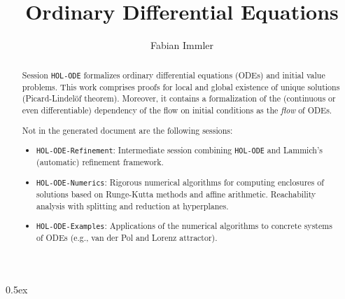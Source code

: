 \documentclass[11pt,a4paper]{article}
\title{Ordinary Differential Equations}
\author{Fabian Immler}
\begin{document}
\maketitle

\begin{abstract}

Session \texttt{HOL-ODE} formalizes ordinary differential equations (ODEs) and initial value
problems. This work comprises proofs for local and global existence of unique solutions
(Picard-Lindelöf theorem). Moreover, it contains a formalization of the (continuous or even
differentiable) dependency of the flow on initial conditions as the \emph{flow} of ODEs.

Not in the generated document are the following sessions:
\begin{itemize}
\item \texttt{HOL-ODE-Refinement}:
  Intermediate session combining \texttt{HOL-ODE} and Lammich's (automatic) refinement framework.
\item \texttt{HOL-ODE-Numerics}:
  Rigorous numerical algorithms for computing enclosures of solutions based on Runge-Kutta methods
  and affine arithmetic. Reachability analysis with splitting and reduction at hyperplanes.
\item \texttt{HOL-ODE-Examples}:
  Applications of the numerical algorithms to concrete systems of ODEs (e.g., van der Pol and Lorenz
    attractor).
\end{itemize}

\end{abstract}

\tableofcontents

\parindent 0pt\parskip 0.5ex





\end{document}
